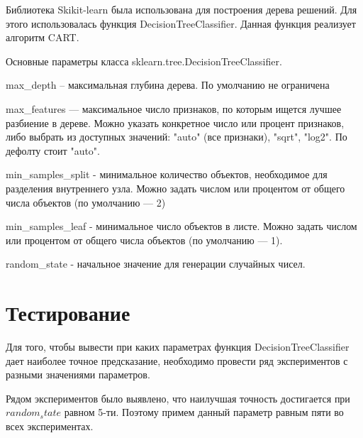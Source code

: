\documentclass[a4paper,12pt]{article}
\begin{document}
	\vspace{0.5cm}
	Библиотека Skikit-learn была использована для построения дерева решений. Для этого использовалась функция DecisionTreeClassifier. Данная функция реализует алгоритм CART.
	
	\vspace{0.5cm}
	Основные параметры класса sklearn.tree.DecisionTreeClassifier.
	
	\vspace{0.5cm}
	max\_depth – максимальная глубина дерева. По умолчанию не ограничена
	
	\vspace{0.5cm}
	max\_features — максимальное число признаков, по которым ищется лучшее разбиение в дереве. Можно указать конкретное число или процент признаков, либо выбрать из доступных значений: "auto" (все признаки), "sqrt", "log2". По дефолту стоит "auto".
	
	\vspace{0.5cm}
	min\_samples\_split - минимальное количество объектов, необходимое для разделения внутреннего узла. Можно задать числом или процентом от общего числа объектов (по умолчанию — 2)
	
	\vspace{0.5cm}
	min\_samples\_leaf - минимальное число объектов в листе. Можно задать числом или процентом от общего числа объектов (по умолчанию — 1).
	
	\vspace{0.5cm}
	random\_state - начальное значение для генерации случайных чисел.


	
\newpage\section{Тестирование}
	Для того, чтобы вывести при каких параметрах функция DecisionTreeClassifier дает наиболее точное предсказание, необходимо провести ряд экспериментов с разными значениями параметров. 
	
	\vspace{0.5cm}
	Рядом экспериментов было выявлено, что наилучшая точность достигается при $random_state$ равном 5-ти. Поэтому примем данный параметр равным пяти во всех экспериментах.
	
\end{document}
